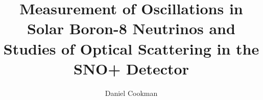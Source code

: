 \title{Measurement of Oscillations in Solar Boron-8 Neutrinos and Studies of Optical Scattering in the SNO+ Detector}


\author{Daniel Cookman}








     



\renewcommand{\submissiontext}{A thesis submitted in fulfilment of the requirements for the degree of}




